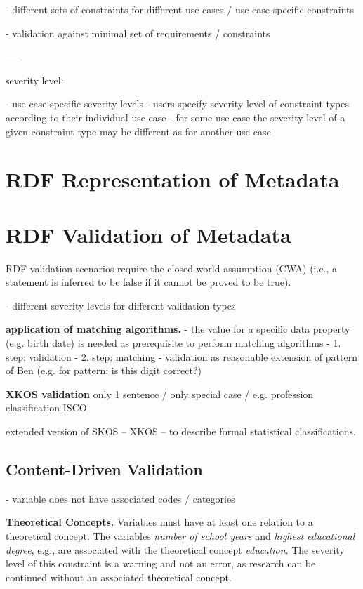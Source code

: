 \documentclass{llncs}
\begin{document}
- different sets of constraints for different use cases / use case specific constraints

- validation against minimal set of requirements / constraints

-----

severity level:

- use case specific severity levels
- users specify severity level of constraint types according to their individual use case
- for some use case the severity level of a given constraint type may be different as for another use case

\section{RDF Representation of Metadata}

\section{RDF Validation of Metadata}

RDF validation scenarios require the closed-world assumption (CWA) (i.e., a statement is inferred to be false if it cannot be proved to be true).

- different severity levels for different validation types

\textbf{application of matching algorithms.}
- the value for a specific data property (e.g. birth date) is needed as prerequisite to perform matching algorithms
- 1. step: validation
- 2. step: matching
- validation as reasonable extension of pattern of Ben (e.g. for pattern: is this digit correct?)

\textbf{XKOS validation}
only 1 sentence / only special case / e.g. profession classification ISCO

extended version of SKOS – XKOS – to describe formal statistical classifications.

\subsection{Content-Driven Validation}

- variable does not have associated codes / categories

\textbf{Theoretical Concepts.}
Variables must have at least one relation to a theoretical concept.
The variables \emph{number of school years} and \emph{highest educational degree}, e.g., are associated with the theoretical concept \emph{education}. 
The severity level of this constraint is a warning and not an error, as research can be continued without an associated theoretical concept.
\end{document}
